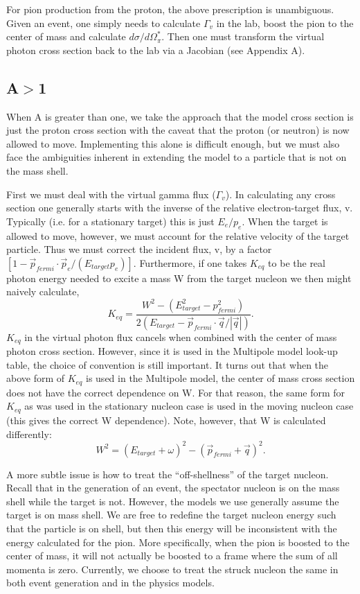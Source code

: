 For pion production from the proton, the above prescription is unambiguous.
Given an event, one simply needs to calculate $\Gamma_v$ in the lab, boost
the pion to the center of mass and calculate $d\sigma/d\Omega_{\pi}^*$.  Then
one must transform the virtual photon cross section back to the lab via a 
Jacobian (see Appendix A).

\subsection{A$>$1}
When A is greater than one, we take the approach that the model cross section
is just the proton cross section with the caveat that the proton (or neutron)
is now allowed to move.  Implementing this alone is difficult enough, but we 
must also face the ambiguities inherent in extending the model to a particle 
that is not on the mass shell.

First we must deal with the virtual gamma flux ($\Gamma_v$). In calculating
any cross section one generally starts with the inverse of the relative 
electron-target flux, v.  Typically
(i.e. for a stationary target) this is just $E_e/p_e$.  When the target is
allowed to move, however, we must account for the relative velocity of the 
target particle.  Thus we must correct the incident flux, v, by a factor
$[1 - \vec{p}_{fermi}\cdot\vec{p}_e/(E_{target}p_e)]$. 
Furthermore, if one takes $K_{eq}$ to be the real photon energy needed to 
excite a mass W from the target nucleon we then might naively calculate,
$$
K_{eq} = \frac{W^2 - (E_{target}^2-p_{fermi}^2)}{2(E_{target}-
\vec{p}_{fermi}  \cdot \vec{q}/|\vec{q}|)}.
$$
$K_{eq}$ in the virtual photon flux cancels when
combined with the center of mass photon cross section.  However, since it is
used in the Multipole model look-up table, the choice of convention is still
important.  It turns out that when the above form of $K_{eq}$ is used in the 
Multipole model, the center of mass cross section does not have the correct 
dependence on W.  For that reason, the same form for $K_{eq}$ as was used
in the stationary nucleon case is used in the moving nucleon case (this gives
the correct W dependence).  Note, however, that W is calculated differently:
$$
W^2 = (E_{target}+\omega)^2 - (\vec{p}_{fermi}+\vec{q})^2.
$$

A more subtle issue is how to treat the ``off-shellness'' of the target 
nucleon.  Recall that in 
the generation of an event, the spectator nucleon is on the mass shell while
the target is not.  However, the models we use generally assume the target is
on mass shell.  We are free to redefine the target nucleon energy such that
the particle is on shell, but then this energy will be inconsistent with
the energy calculated for the pion.  More specifically, when the pion is 
boosted to the center of mass, it will not actually be boosted to a frame 
where the sum of all momenta is zero.  Currently, we choose to treat the 
struck nucleon the same in both event generation and in the physics
models.


